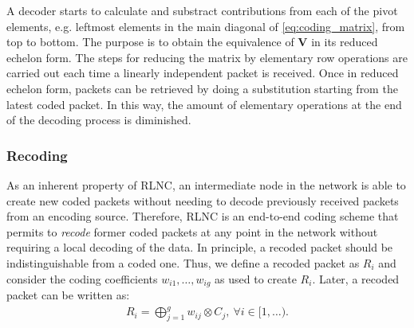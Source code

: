 A decoder starts to calculate and substract contributions from each
of the pivot elements, e.g. leftmost elements in the main diagonal of
\eqref{eq:coding_matrix}, from top to bottom. The purpose is to obtain
the equivalence of $\textbf{V}$ in its reduced echelon form. The steps
for reducing the matrix by elementary row operations are carried out each time
a linearly independent packet is received. Once in reduced echelon form, packets
can be retrieved by doing a substitution starting from the latest
coded packet. In this way, the amount of elementary operations at the end
of the decoding process is diminished.

\subsubsection{Recoding}
As an inherent property of \ac{RLNC}, an intermediate node in the network
is able to create new coded packets without needing to decode previously
received packets from an encoding source. Therefore, \ac{RLNC} is an end-to-end
coding scheme that permits to \textit{recode} former coded packets at any
point in the network without requiring a local decoding of the data. In
principle, a recoded packet should be indistinguishable from a coded one.
Thus, we define a recoded packet as $R_i$ and consider the coding
coefficients $w_{i1}, \ldots, w_{ig}$ as used to
create $R_i$. Later, a recoded packet can be written as:
%
\begin{align}
\label{eq:recoded_packet}
R_i = \bigoplus_{j=1}^{g} w_{ij} \otimes C_j  ,\ \forall i \in [1,\ldots).
\end{align}

